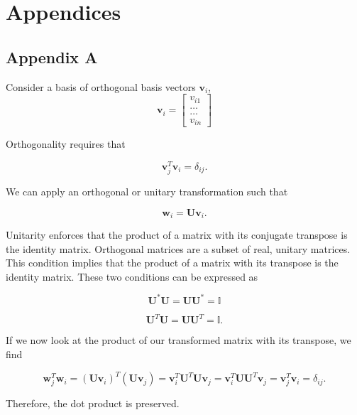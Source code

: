 \documentclass[%
oneside,                 %
final,                   %
10pt]{article}
\begin{document}
\section{Appendices}

\subsection{Appendix A} \label{A}

Consider a basis of orthogonal basis vectors $\mathbf{v}_i$,
\[
\mathbf{v}_i = \begin{bmatrix} v_{i1} \\ \dots \\ \dots \\v_{in} \end{bmatrix}
\]

Orthogonality requires that 

\[
\mathbf{v}_j^T\mathbf{v}_i = \delta_{ij}.
\]

We can apply an orthogonal or unitary transformation such that

\[
\mathbf{w}_i=\mathbf{U}\mathbf{v}_i.
\]

Unitarity enforces that the product of a matrix with its conjugate transpose is the identity matrix.  Orthogonal matrices are a subset of real, unitary matrices.  This condition implies that the product of a matrix with its transpose is the identity matrix.  These two conditions can be expressed as

\[
\mathbf{U}^* \mathbf{U} = \mathbf{U} \mathbf{U}^* = \mathbb{I}
\]

\[
\mathbf{U}^T \mathbf{U} = \mathbf{U} \mathbf{U}^T = \mathbb{I}.
\]

If we now look at the product of our transformed matrix with its transpose, we find

\[
\mathbf{w}^T_j\mathbf{w}_i = (\mathbf{U}\mathbf{v}_i)^T(\mathbf{U}\mathbf{v}_j)= \mathbf{v}_i^T\mathbf{U}^T\mathbf{U}\mathbf{v}_j=\mathbf{v}_i^T\mathbf{U}\mathbf{U}^T\mathbf{v}_j =\mathbf{v}_j^T\mathbf{v}_i = \delta_{ij}.
\]

Therefore, the dot product is preserved.
\end{document}
